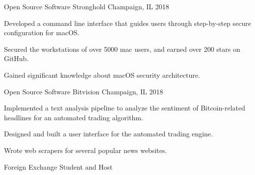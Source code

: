 

\begin{cventries}
\cventry
{Open Source Software} %
{Stronghold} %
{Champaign, IL} %
{2018} %
{
	\begin{cvitems} %
		\item {Developed a command line interface that guides users through step-by-step secure configuration for macOS.}
		\item {Secured the workstations of over 5000 mac users, and earned over 200 stars on GitHub.}
		\item{Gained significant knowledge about macOS security architecture.} 
	\end{cvitems}
}
\cventry
{Open Source Software} %
{Bitvision} %
{Champaign, IL} %
{2018} %
{
	\begin{cvitems} %
		\item {Implemented a text analysis pipeline to analyze the sentiment of Bitcoin-related headlines for an automated trading algorithm.}
		\item {Designed and built a user interface for the automated trading engine.}
		\item{Wrote web scrapers for several popular news websites.} 
	\end{cvitems}
}
\cventry
{Foreign Exchange Student and Host} %

\end{cventries}
